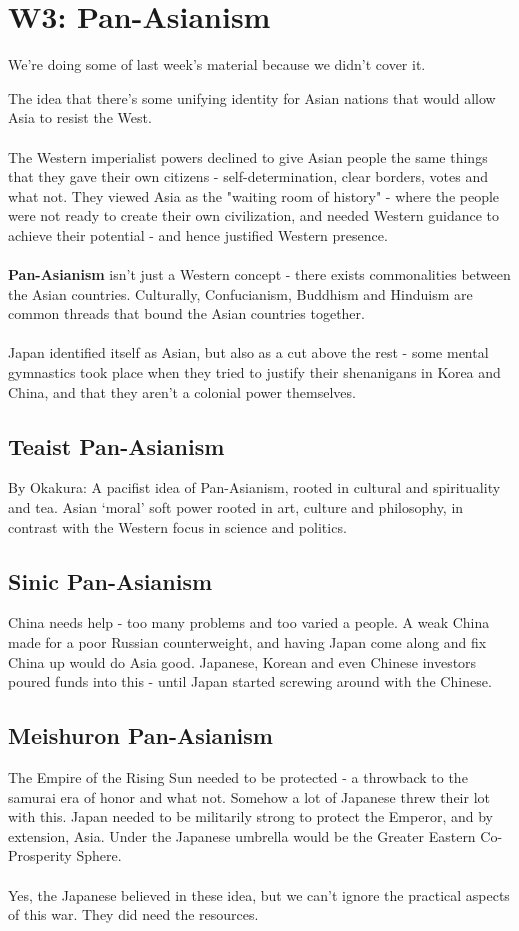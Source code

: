 \documentclass[a4paper]{article}
\begin{document}
\section{W3: Pan-Asianism}
\begin{framed}
	\begin{displayquote}
		We're doing some of last week's material because we didn't cover it.
	\end{displayquote}
\end{framed}
The idea that there's some unifying identity for Asian nations that would allow Asia to resist the West.\\
\\
The Western imperialist powers declined to give Asian people the same things that they gave their own citizens - self-determination, clear borders, votes and what not. They viewed Asia as the "waiting room of history" - where the people were not ready to create their own civilization, and needed Western guidance to achieve their potential - and hence justified Western presence.\\
\\
\textbf{Pan-Asianism} isn't just a Western concept - there exists commonalities between the Asian countries. Culturally, Confucianism, Buddhism and Hinduism are common threads that bound the Asian countries together.\\
\\
Japan identified itself as Asian, but also as a cut above the rest - some mental gymnastics took place when they tried to justify their shenanigans in Korea and China, and that they aren't a colonial power themselves. 
\subsection{Teaist Pan-Asianism}
By Okakura: A pacifist idea of Pan-Asianism, rooted in cultural and spirituality and tea. Asian `moral' soft power rooted in art, culture and philosophy, in contrast with the Western focus in science and politics.
\subsection{Sinic Pan-Asianism}
China needs help - too many problems and too varied a people. A weak China made for a poor Russian counterweight, and having Japan come along and fix China up would do Asia good. Japanese, Korean and even Chinese investors poured funds into this - until Japan started screwing around with the Chinese.
\subsection{Meishuron Pan-Asianism}
The Empire of the Rising Sun needed to be protected - a throwback to the samurai era of honor and what not. Somehow  a lot of Japanese threw their lot with this. Japan needed to be militarily strong to protect the Emperor, and by extension, Asia. Under the Japanese umbrella would be the Greater Eastern Co-Prosperity Sphere.\\
\\
Yes, the Japanese believed in these idea, but we can't ignore the practical aspects of this war. They did need the resources.
\end{document}
